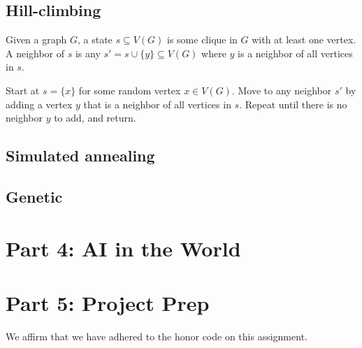 \documentclass[11pt]{amsart}
\newcommand{\honor}{We affirm that we have adhered to the honor code on this assignment.}
\begin{document}
\subsection*{Hill-climbing}  Given a graph $G$, a state $s \subseteq V(G)$ is some clique in $G$
with at least one vertex.  A neighbor of $s$ is any $s' = s \cup \{y\} \subseteq V(G)$ where $y$ is a
neighbor of all vertices in $s$.

Start at $s = \{x\}$ for some random vertex $x \in V(G)$.  Move to any neighbor $s'$ by adding a
vertex $y$ that is a neighbor of all vertices in $s$.  Repeat until there is no neighbor $y$ to add,
and return.

\subsection*{Simulated annealing}

\subsection*{Genetic}

\section*{Part 4: AI in the World}

\section*{Part 5: Project Prep}

\honor
\end{document}
